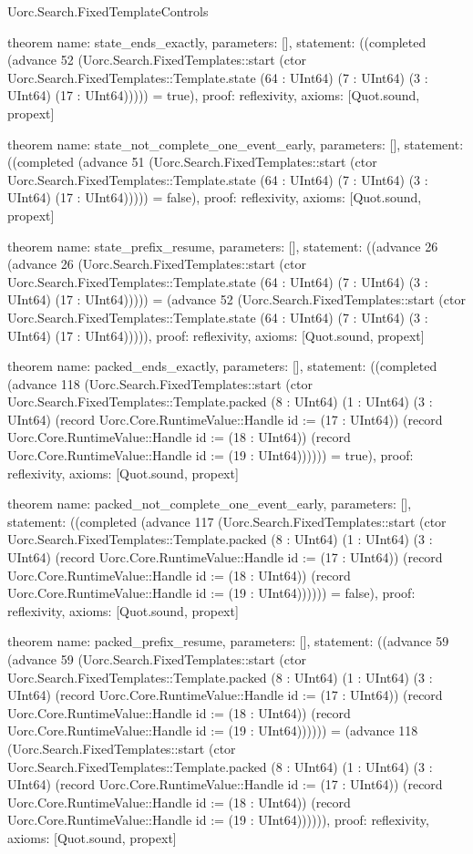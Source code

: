 \begin{lexlean}{Uorc.Search.FixedTemplateControls}
\begin{semanticmodule}
theorem{
  name: state_ends_exactly,
  parameters: [],
  statement: ((completed (advance 52 (Uorc.Search.FixedTemplates::start (ctor Uorc.Search.FixedTemplates::Template.state (64 : UInt64) (7 : UInt64) (3 : UInt64) (17 : UInt64))))) = true),
  proof: reflexivity{},
  axioms: [Quot.sound, propext]
}

theorem{
  name: state_not_complete_one_event_early,
  parameters: [],
  statement: ((completed (advance 51 (Uorc.Search.FixedTemplates::start (ctor Uorc.Search.FixedTemplates::Template.state (64 : UInt64) (7 : UInt64) (3 : UInt64) (17 : UInt64))))) = false),
  proof: reflexivity{},
  axioms: [Quot.sound, propext]
}

theorem{
  name: state_prefix_resume,
  parameters: [],
  statement: ((advance 26 (advance 26 (Uorc.Search.FixedTemplates::start (ctor Uorc.Search.FixedTemplates::Template.state (64 : UInt64) (7 : UInt64) (3 : UInt64) (17 : UInt64))))) = (advance 52 (Uorc.Search.FixedTemplates::start (ctor Uorc.Search.FixedTemplates::Template.state (64 : UInt64) (7 : UInt64) (3 : UInt64) (17 : UInt64))))),
  proof: reflexivity{},
  axioms: [Quot.sound, propext]
}

theorem{
  name: packed_ends_exactly,
  parameters: [],
  statement: ((completed (advance 118 (Uorc.Search.FixedTemplates::start (ctor Uorc.Search.FixedTemplates::Template.packed (8 : UInt64) (1 : UInt64) (3 : UInt64) (record Uorc.Core.RuntimeValue::Handle {id := (17 : UInt64)}) (record Uorc.Core.RuntimeValue::Handle {id := (18 : UInt64)}) (record Uorc.Core.RuntimeValue::Handle {id := (19 : UInt64)}))))) = true),
  proof: reflexivity{},
  axioms: [Quot.sound, propext]
}

theorem{
  name: packed_not_complete_one_event_early,
  parameters: [],
  statement: ((completed (advance 117 (Uorc.Search.FixedTemplates::start (ctor Uorc.Search.FixedTemplates::Template.packed (8 : UInt64) (1 : UInt64) (3 : UInt64) (record Uorc.Core.RuntimeValue::Handle {id := (17 : UInt64)}) (record Uorc.Core.RuntimeValue::Handle {id := (18 : UInt64)}) (record Uorc.Core.RuntimeValue::Handle {id := (19 : UInt64)}))))) = false),
  proof: reflexivity{},
  axioms: [Quot.sound, propext]
}

theorem{
  name: packed_prefix_resume,
  parameters: [],
  statement: ((advance 59 (advance 59 (Uorc.Search.FixedTemplates::start (ctor Uorc.Search.FixedTemplates::Template.packed (8 : UInt64) (1 : UInt64) (3 : UInt64) (record Uorc.Core.RuntimeValue::Handle {id := (17 : UInt64)}) (record Uorc.Core.RuntimeValue::Handle {id := (18 : UInt64)}) (record Uorc.Core.RuntimeValue::Handle {id := (19 : UInt64)}))))) = (advance 118 (Uorc.Search.FixedTemplates::start (ctor Uorc.Search.FixedTemplates::Template.packed (8 : UInt64) (1 : UInt64) (3 : UInt64) (record Uorc.Core.RuntimeValue::Handle {id := (17 : UInt64)}) (record Uorc.Core.RuntimeValue::Handle {id := (18 : UInt64)}) (record Uorc.Core.RuntimeValue::Handle {id := (19 : UInt64)}))))),
  proof: reflexivity{},
  axioms: [Quot.sound, propext]
}


\end{semanticmodule}
\end{lexlean}
